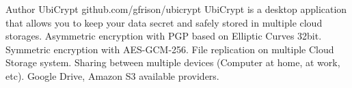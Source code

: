 
\begin{cventries}
  \cventry
    {Author} %
    {UbiCrypt} %
    {github.com/gfrison/ubicrypt} %
    {} %
    {
    UbiCrypt is a desktop application that allows you to keep your data secret and safely stored in multiple cloud storages.
    Asymmetric encryption with PGP based on Elliptic Curves 32bit.
    Symmetric encryption with AES-GCM-256.
    File replication on multiple Cloud Storage system.
    Sharing between multiple devices (Computer at home, at work, etc).
    Google Drive, Amazon S3 available providers.
    }

\end{cventries}
